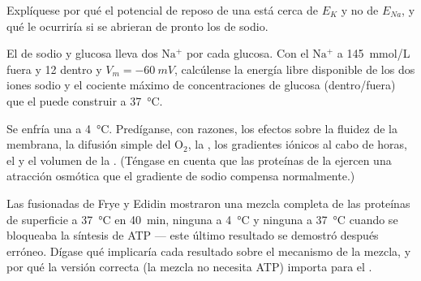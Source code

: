 \begin{exercise}[$\star\star$]\label{exo:b1:membranes-transport:8}
Explíquese por qué el potencial de reposo de una  está cerca de $E_K$
y no de $E_{Na}$, y qué le ocurriría si se abrieran de pronto los  de
sodio.
\end{exercise}

\begin{exercise}[$\star\star$]\label{exo:b1:membranes-transport:9}
El  de sodio y glucosa lleva dos $\mathrm{Na^+}$ por cada
glucosa. Con el $\mathrm{Na^+}$ a \qty{145}{mmol/L} fuera y \qty{12}{}
dentro y $V_m = \qty{-60}{mV}$, calcúlense la energía libre disponible de
los dos iones sodio y el cociente máximo de concentraciones de glucosa
(dentro/fuera) que el  puede construir a \qty{37}{\celsius}.
\end{exercise}

\begin{exercise}[$\star\star\star$]\label{exo:b1:membranes-transport:10}
Se enfría una  a \qty{4}{\celsius}. Predíganse, con razones, los
efectos sobre la fluidez de la membrana, la difusión simple del
$\mathrm{O_2}$, la , los gradientes iónicos al cabo de horas, el
 y el volumen de la . (Téngase en cuenta que las
proteínas de la  ejercen una atracción osmótica que el gradiente de
sodio compensa normalmente.)
\end{exercise}

\begin{exercise}[$\star\star\star$]\label{exo:b1:membranes-transport:11}
Las  fusionadas de Frye y Edidin mostraron una mezcla completa de las
proteínas de superficie a \qty{37}{\celsius} en \qty{40}{min}, ninguna a
\qty{4}{\celsius} y ninguna a \qty{37}{\celsius} cuando se bloqueaba la
síntesis de ATP --- este último resultado se demostró después erróneo.
Dígase qué implicaría cada resultado sobre el mecanismo de la mezcla, y por
qué la versión correcta (la mezcla no necesita ATP) importa para el .
\end{exercise}

